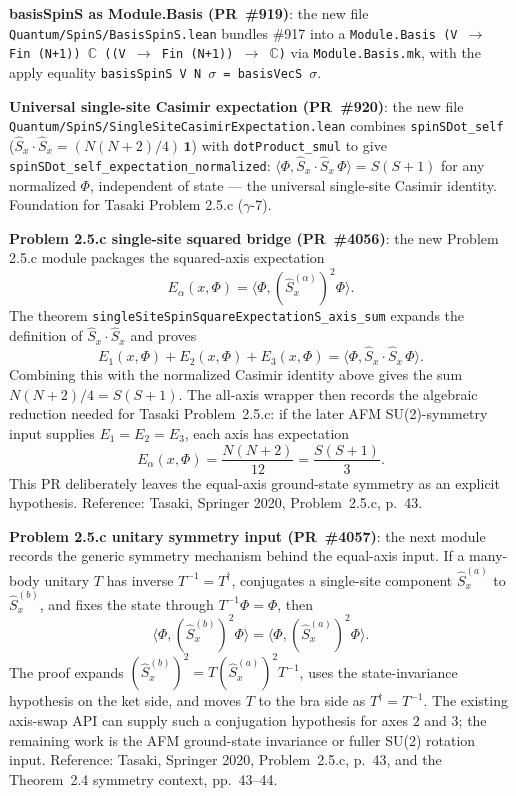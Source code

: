 \documentclass[a4paper,11pt]{article}
\begin{document}
\textbf{basisSpinS as Module.Basis (PR~\#919)}: the new file
\texttt{Quantum/SpinS/BasisSpinS.lean} bundles \#917 into a
\texttt{Module.Basis (V $\to$ Fin (N+1)) $\mathbb{C}$
((V $\to$ Fin (N+1)) $\to$ $\mathbb{C}$)} via
\texttt{Module.Basis.mk}, with the apply equality
\texttt{basisSpinS V N $\sigma$ = basisVecS $\sigma$}.

\textbf{Universal single-site Casimir expectation (PR~\#920)}: the
new file \texttt{Quantum/SpinS/SingleSiteCasimirExpectation.lean}
combines \texttt{spinSDot\_self} ($\hat{S}_x \cdot \hat{S}_x =
(N(N+2)/4)\,\mathbf{1}$) with \texttt{dotProduct\_smul} to give
\texttt{spinSDot\_self\_expectation\_normalized}: $\langle\Phi,
\hat{S}_x \cdot \hat{S}_x\,\Phi\rangle = S(S+1)$ for any normalized
$\Phi$, independent of state — the universal single-site Casimir
identity. Foundation for Tasaki Problem 2.5.c ($\gamma$-7).

\textbf{Problem 2.5.c single-site squared bridge (PR~\#4056)}: the
new Problem 2.5.c module packages the squared-axis expectation
\[
  E_\alpha(x,\Phi)=
  \langle \Phi,(\hat{S}^{(\alpha)}_x)^2\Phi\rangle .
\]
The theorem
\texttt{singleSiteSpinSquareExpectationS\_axis\_sum} expands the
definition of \(\hat{S}_x\cdot \hat{S}_x\) and proves
\[
  E_1(x,\Phi)+E_2(x,\Phi)+E_3(x,\Phi)
  =
  \langle\Phi,\hat{S}_x\cdot \hat{S}_x\,\Phi\rangle .
\]
Combining this with the normalized Casimir identity above gives the
sum \(N(N+2)/4=S(S+1)\).  The all-axis wrapper then records the
algebraic reduction needed for Tasaki Problem~2.5.c: if the later
AFM SU(2)-symmetry input supplies
\(E_1=E_2=E_3\), each axis has expectation
\[
  E_\alpha(x,\Phi)=\frac{N(N+2)}{12}=\frac{S(S+1)}{3}.
\]
This PR deliberately leaves the equal-axis ground-state symmetry as an
explicit hypothesis.  Reference: Tasaki, Springer 2020, Problem~2.5.c,
p.~43.

\textbf{Problem 2.5.c unitary symmetry input (PR~\#4057)}: the
next module records the generic symmetry mechanism behind the equal-axis
input.  If a many-body unitary \(T\) has inverse \(T^{-1}=T^\dagger\),
conjugates a single-site component \(\hat S_x^{(a)}\) to
\(\hat S_x^{(b)}\), and fixes the state through \(T^{-1}\Phi=\Phi\), then
\[
  \langle\Phi,(\hat S_x^{(b)})^2\Phi\rangle
  =
  \langle\Phi,(\hat S_x^{(a)})^2\Phi\rangle .
\]
The proof expands \((\hat S_x^{(b)})^2=T(\hat S_x^{(a)})^2T^{-1}\),
uses the state-invariance hypothesis on the ket side, and moves \(T\) to
the bra side as \(T^\dagger=T^{-1}\).  The existing axis-swap API can
supply such a conjugation hypothesis for axes \(2\) and \(3\); the remaining
work is the AFM ground-state invariance or fuller SU(2) rotation input.
Reference: Tasaki, Springer 2020, Problem~2.5.c, p.~43, and the
Theorem~2.4 symmetry context, pp.~43--44.
\end{document}
